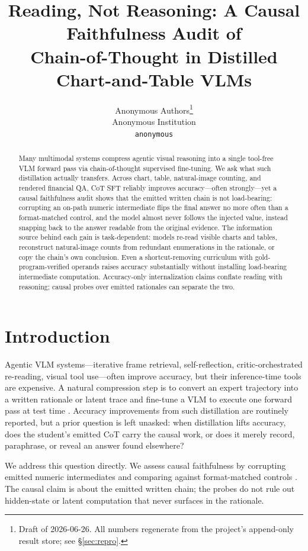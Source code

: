 \documentclass[11pt]{article}
\title{\bf Reading, Not Reasoning: A Causal Faithfulness Audit of\\ Chain-of-Thought in Distilled Chart-and-Table VLMs}
\author{%
  Anonymous Authors\thanks{Draft of 2026-06-26. All numbers regenerate from the project's append-only result store; see \S\ref{sec:repro}.}\\
  Anonymous Institution\\
  \texttt{anonymous}
}
\date{}
\begin{document}
\maketitle

\begin{abstract}
Many multimodal systems compress agentic visual reasoning into a single
tool-free VLM forward pass via chain-of-thought supervised fine-tuning.
We ask what such distillation actually transfers.
%
Across chart, table, natural-image counting, and rendered financial QA,
CoT SFT reliably improves accuracy---often strongly---yet a causal
faithfulness audit shows that the emitted written chain is not
load-bearing: corrupting an on-path numeric intermediate flips the
final answer no more often than a format-matched control, and the model
almost never follows the injected value, instead snapping back to
the answer readable from the original evidence.
%
The information source behind each gain is task-dependent: models
re-read visible charts and tables, reconstruct natural-image counts
from redundant enumerations in the rationale, or copy the chain's own
conclusion.  Even a shortcut-removing curriculum with
gold-program-verified operands raises accuracy substantially without
installing load-bearing intermediate computation.
%
Accuracy-only internalization claims conflate reading with reasoning;
causal probes over emitted rationales can separate the two.
\end{abstract}

\section{Introduction}
\label{sec:intro}

Agentic VLM systems---iterative frame retrieval, self-reflection, critic-orchestrated re-reading, visual tool use---often improve accuracy, but their inference-time tools are expensive. A natural compression step is to convert an expert trajectory into a written rationale or latent trace and fine-tune a VLM to execute one forward pass at test time \citep{vpd,chartpali,pearl,zoomingwithoutzooming,locus}. Accuracy improvements from such distillation are routinely reported, but a prior question is left unasked: when distillation lifts accuracy, does the student's emitted CoT carry the causal work, or does it merely record, paraphrase, or reveal an answer found elsewhere?

We address this question directly. We assess causal faithfulness by corrupting emitted numeric intermediates and comparing against format-matched controls \citep{lanham2023}. The causal claim is about the emitted written chain; the probes do not rule out hidden-state or latent computation that never surfaces in the rationale.
\end{document}
